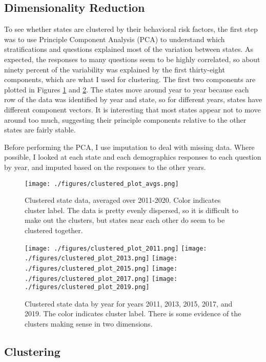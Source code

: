 \documentclass[11pt]{article}
\begin{document}
\subsection{Dimensionality Reduction}
To see whether states are clustered by their behavioral risk factors, the first step was to use Principle Component Analysis (PCA) to understand which stratifications and questions explained most of the variation between states. As expected, the responses to many questions seem to be highly correlated, so about ninety percent of the variability was explained by the first thirty-eight components, which are what I used for clustering. The first two components are plotted in Figures \ref{fig:clustered_avgs} and \ref{fig:clustered_data}. The states move around year to year because each row of the data was identified by year and state, so for different years, states have different component vectors. It is interesting that most states appear not to move around too much, suggesting their principle components relative to the other states are fairly stable.

Before performing the PCA, I use imputation to deal with missing data. Where possible, I looked at each state and each demographics responses to each question by year, and imputed based on the responses to the other years.


\begin{figure}[htbp]
\centering
\texttt{[image: ./figures/clustered\_plot\_avgs.png]}
\caption{
  Clustered state data, averaged over 2011-2020. Color indicates cluster label. The data is pretty evenly dispersed, so it is difficult to make out the clusters, but states near each other do seem to be clustered together.
}
\label{fig:clustered_avgs}
\end{figure}

\begin{figure}[hp]
\texttt{[image: ./figures/clustered\_plot\_2011.png]}
\texttt{[image: ./figures/clustered\_plot\_2013.png]}
\texttt{[image: ./figures/clustered\_plot\_2015.png]}
\texttt{[image: ./figures/clustered\_plot\_2017.png]}
\texttt{[image: ./figures/clustered\_plot\_2019.png]}
\caption{
  Clustered state data by year for years 2011, 2013, 2015, 2017, and 2019. The color indicates cluster label. There is some evidence of the clusters making sense in two dimensions.
}
\label{fig:clustered_data}
\end{figure}


\subsection{Clustering}
\end{document}

